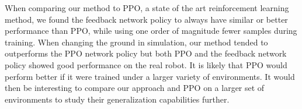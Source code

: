 When comparing our method to PPO, a state of the art reinforcement learning method, we found the feedback network policy to always have similar or better performance than PPO, while using one order of magnitude fewer samples during training. When changing the ground in simulation, our method tended to outperforms the PPO network policy but both PPO and the feedback network policy showed good performance on the real robot.
It is likely that PPO would perform better if it were trained under a larger variety of environments. It would then be interesting to compare our approach and PPO on a larger set of environments to study their generalization capabilities further.
%


\addtolength{\textheight}{5cm}   %






{}


